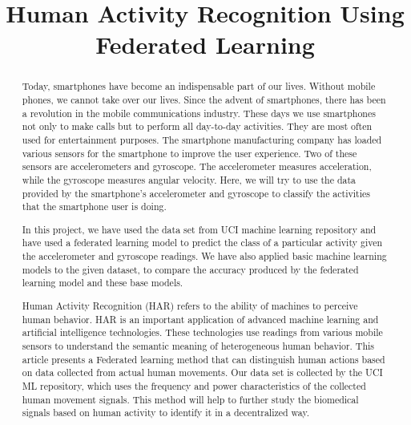 \documentclass[12pt,conference]{IEEEtran}
\begin{document}
\title{Human Activity Recognition Using Federated Learning}
 
\author{
}

\maketitle{}

\begin{abstract}

Today, smartphones have become an indispensable part of our lives. Without mobile phones, we cannot take over our lives. Since the advent of smartphones, there has been a revolution in the mobile communications industry. These days we use smartphones not only to make calls but to perform all day-to-day activities. They are most often used for entertainment purposes. The smartphone manufacturing company has loaded various sensors for the smartphone to improve the user experience. Two of these sensors are accelerometers and gyroscope. The accelerometer measures acceleration, while the gyroscope measures angular velocity. Here, we will try to use the data provided by the smartphone's accelerometer and gyroscope to classify the activities that the smartphone user is doing.

In this project, we have used the data set from UCI machine learning repository \cite{1dataset} and have used a federated learning model to predict the class of a particular activity given the accelerometer and gyroscope readings. We have also applied basic machine learning models to the given dataset, to compare the accuracy produced by the federated learning model and these base models. 

Human Activity Recognition (HAR) refers to the ability of machines to perceive human behavior. HAR is an important application of advanced machine learning and artificial intelligence technologies. These technologies use readings from various mobile sensors \cite{1dataset} to understand the semantic meaning of heterogeneous human behavior. This article presents a Federated learning method that can distinguish human actions based on data collected from actual human movements. Our data set is collected by the UCI ML repository, which uses the frequency and power characteristics of the collected human movement signals. This method will help to further study the biomedical signals based on human 
activity to identify it in a decentralized way.


\end{abstract}
\end{document}
